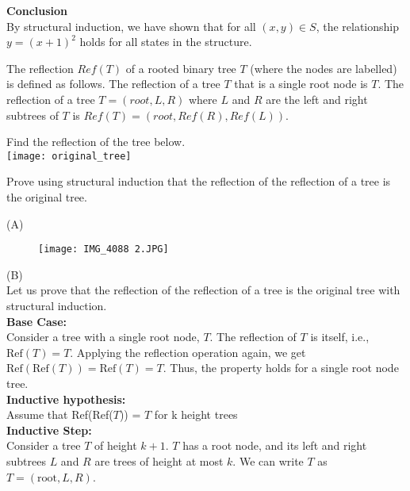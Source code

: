 \documentclass[solution,letterpaper]{cs20}
\begin{document}
\begin{problem}
\begin{solution}
        \textbf{Conclusion} \\
        By structural induction, we have shown that for all \( (x, y) \in S \), the relationship \( y = (x + 1)^2 \) holds for all states in the structure.
        \end{solution}
    \end{problem}
    \newpage

    \begin{problem}
        The reflection $Ref(T)$ of a rooted binary tree $T$ (where
        the nodes are labelled) is defined as follows.
        The reflection of a tree $T$ that is a single root node is $T$.
        The reflection of a tree $T = (root,L,R)$ where $L$
        and $R$ are the left and right subtrees of $T$ is
        $Ref(T) = (root,Ref(R),Ref(L))$.

        \subproblem Find the reflection of the tree below.\\

        \texttt{[image: original\_tree]}

        \subproblem Prove using structural induction that the reflection of the reflection of a tree is the original tree.

        \begin{solution}
        (A) \\
        \begin{figure}[h]
            \centering
            \texttt{[image: IMG\_4088 2.JPG]}
            \label{fig:enter-label}
        \end{figure}

        (B) \\
        Let us prove that the reflection of the reflection of a tree is the original tree with structural induction. \\

        \textbf{Base Case:} \\
        Consider a tree with a single root node, \( T \). The reflection of \( T \) is itself, i.e., \(\text{Ref}(T) = T\). Applying the reflection operation again, we get \(\text{Ref}(\text{Ref}(T)) = \text{Ref}(T) = T\). Thus, the property holds for a single root node tree. \\

        \textbf{Inductive hypothesis:} \\
        Assume that Ref(Ref($T$)) = $T$ for k height trees \\

        \textbf{Inductive Step:} \\
        Consider a tree \( T \) of height \( k+1 \). \( T \) has a root node, and its left and right subtrees \( L \) and \( R \) are trees of height at most \( k \). We can write \( T \) as \( T = (\text{root}, L, R) \). \\


\end{solution}
\end{problem}
\end{document}
